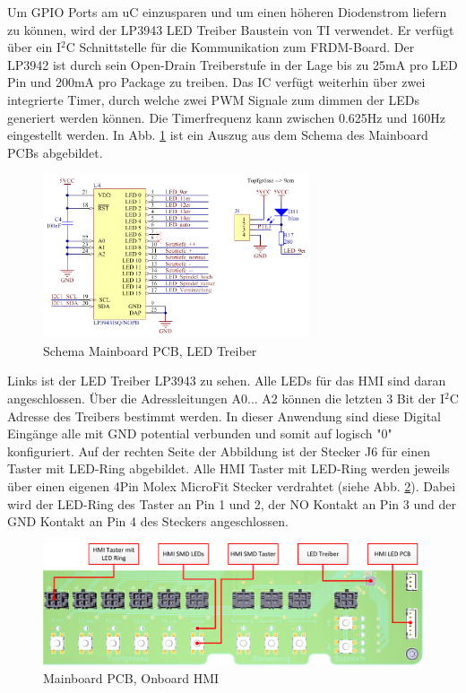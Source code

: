 Um GPIO Ports am uC einzusparen und um einen höheren Diodenstrom liefern zu können, wird der LP3943 LED Treiber Baustein von TI verwendet. Er verfügt über ein I$^{2}$C Schnittstelle für die Kommunikation zum FRDM-Board. Der LP3942 ist durch sein Open-Drain Treiberstufe in der Lage bis zu 25mA pro LED Pin und 200mA pro Package zu treiben. Das IC verfügt weiterhin über zwei integrierte Timer, durch welche zwei PWM Signale zum dimmen der LEDs generiert werden können. Die Timerfrequenz kann zwischen 0.625Hz und 160Hz eingestellt werden. In Abb. \ref{fig:Mainboard_LED_Driver_LP3943} ist ein Auszug aus dem Schema des Mainboard PCBs abgebildet. 

\begin{figure}[H]
	\includegraphics[width=0.7\textwidth]{Illustrationen/6-Umsetzung/Schema_Mainboard_LP39431.png}
	\caption{Schema Mainboard PCB, LED Treiber}
	\label{fig:Mainboard_LED_Driver_LP3943}
\end{figure}

Links ist der LED Treiber LP3943 zu sehen. Alle LEDs für das HMI sind daran angeschlossen. Über die Adressleitungen A0... A2 können die letzten 3 Bit der I$^{2}$C Adresse des Treibers bestimmt werden. In dieser Anwendung sind diese Digital Eingänge alle mit GND potential verbunden und somit auf logisch "0" konfiguriert. Auf der rechten Seite der Abbildung ist der Stecker J6 für einen Taster mit LED-Ring abgebildet. Alle HMI Taster mit LED-Ring werden jeweils über einen eigenen 4Pin Molex MicroFit Stecker verdrahtet (siehe Abb. \ref{fig:Mainboard_HMI_Layout}). Dabei wird der LED-Ring des Taster an Pin 1 und 2, der NO Kontakt an Pin 3 und der GND Kontakt an Pin 4 des Steckers angeschlossen.

\begin{figure}[H]
	\includegraphics[width=1\textwidth]{Illustrationen/6-Umsetzung/HMI_Layout.jpg}
	\caption{Mainboard PCB, Onboard HMI}
	\label{fig:Mainboard_HMI_Layout}
\end{figure}


